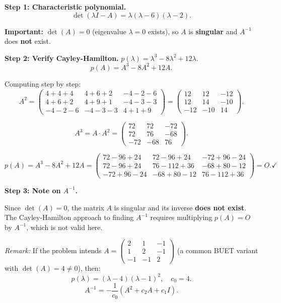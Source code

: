 \documentclass[12pt,a3paper]{article}
\begin{document}
 
\begin{tcolorbox}[enhanced,breakable,
  colback=cE!4,colframe=cE,boxrule=0.8pt,arc=5pt,
  title={\textbf{Answer --- Cayley-Hamilton for $A=\begin{pmatrix}2&2&-2\\2&3&-1\\-2&-1&3\end{pmatrix}$}},
  fonttitle=\bfseries\color{white},colbacktitle=cE]

\textbf{Step 1: Characteristic polynomial.}
\[
\det(\lambda I-A) = \lambda(\lambda-6)(\lambda-2).
\]

\textbf{Important:} $\det(A)=0$ (eigenvalue $\lambda=0$ exists), so $A$ is \textbf{singular} and $A^{-1}$ does \textbf{not} exist.

\textbf{Step 2: Verify Cayley-Hamilton.} $p(\lambda)=\lambda^3-8\lambda^2+12\lambda$.
\[
p(A) = A^3-8A^2+12A.
\]

Computing step by step:
\[
A^2=\begin{pmatrix}4+4+4&4+6+2&-4-2-6\\4+6+2&4+9+1&-4-3-3\\-4-2-6&-4-3-3&4+1+9\end{pmatrix}
=\begin{pmatrix}12&12&-12\\12&14&-10\\-12&-10&14\end{pmatrix}.
\]

\[
A^3 = A\cdot A^2 = \begin{pmatrix}72&72&-72\\72&76&-68\\-72&-68&76\end{pmatrix}.
\]

\[
p(A)=A^3-8A^2+12A
=\begin{pmatrix}72-96+24&72-96+24&-72+96-24\\72-96+24&76-112+36&-68+80-12\\-72+96-24&-68+80-12&76-112+36\end{pmatrix}
= O. \checkmark
\]

\textbf{Step 3: Note on $A^{-1}$.}

Since $\det(A)=0$, the matrix $A$ is singular and its inverse \textbf{does not exist}. The Cayley-Hamilton approach to finding $A^{-1}$ requires multiplying $p(A)=O$ by $A^{-1}$, which is not valid here.

\textit{Remark:} If the problem intends $A=\begin{pmatrix}2&1&-1\\1&2&-1\\-1&-1&2\end{pmatrix}$ (a common BUET variant with $\det(A)=4\neq0$), then:
\[
p(\lambda)=(\lambda-4)(\lambda-1)^2,\quad c_0=4.
\]
\[
A^{-1}=-\frac{1}{c_0}(A^2+c_2 A+c_1 I).
\]

\end{tcolorbox}
\end{document}

